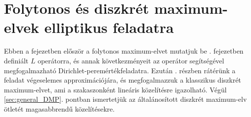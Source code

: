 \chapter{Folytonos és diszkrét maximum-elvek elliptikus feladatra}\label{ch:Maxelvek}

Ebben a fejezetben először a folytonos maximum-elvet mutatjuk be . fejezetben definiált $L$ operátorra, és annak következményeit az operátor segítségével megfogalmazható Dirichlet-peremértékfeladatra. Ezután . részben rátérünk a feladat végeselemes approximációjára, és megfogalmazzuk a klasszikus diszkrét maximum-elvet, ami a szakaszonként lineáris közelítésre igazolható. Végül \ref{sec:general_DMP}. pontban ismertetjük az általánosított diszkrét maximum-elv ötletét  magasabbrendű közelítésekre.


 
